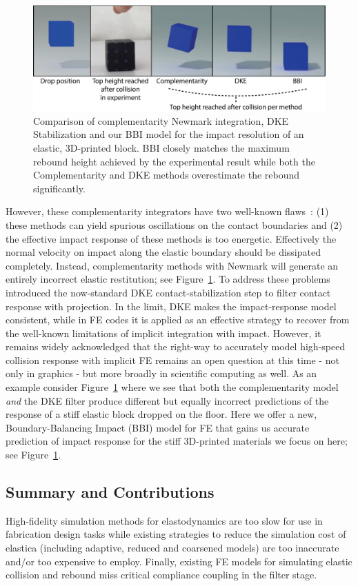 \begin{figure}
	\centering
	\includegraphics[width=0.8\columnwidth]{figs/Figure_2_BBI}	
	\caption{Comparison of complementarity Newmark integration, DKE Stabilization and our BBI model for the impact resolution of an elastic, 3D-printed block. BBI closely matches the maximum rebound height achieved by the experimental result while both the Complementarity and DKE methods overestimate the rebound significantly.}
	\label{fig:BBI_block_compare}
\end{figure}

However, these complementarity integrators have two well-known flaws~\cite{Deuflhard:2008fu}: (1) these methods can yield spurious oscillations on the contact boundaries and (2) the effective impact response of these methods is too energetic. Effectively the normal velocity on impact along the elastic boundary should be dissipated completely. Instead, complementarity methods with Newmark will generate an entirely incorrect elastic restitution; see Figure~\ref{fig:BBI_block_compare}. To address these problems~\citet{Deuflhard:2008fu} introduced the now-standard DKE contact-stabilization step to filter contact response with projection. In the limit, DKE makes the impact-response model consistent,
while in FE codes it is applied as an effective strategy to recover from the well-known limitations of implicit integration with impact. However, it remains widely acknowledged that the right-way to accurately model high-speed collision response with implicit FE remains an open question at this time - not only in graphics - but more broadly in scientific computing as well. As an example consider Figure~\ref{fig:BBI_block_compare} where we see that both the complementarity model \emph{and} the DKE filter produce different but equally incorrect predictions of the response of a stiff elastic block dropped on the floor. Here we offer a new, Boundary-Balancing Impact (BBI) model for FE that gains us accurate prediction of impact response for the stiff 3D-printed materials we focus on here; see Figure~\ref{fig:BBI_block_compare}.

\subsection{Summary and Contributions}
High-fidelity simulation methods for elastodynamics are too slow for use in fabrication design tasks while existing strategies to reduce the simulation cost of elastica (including adaptive, reduced and coarsened models) are too inaccurate and/or too expensive to employ. Finally, existing FE models for simulating elastic collision and rebound miss critical compliance coupling in the filter stage.

